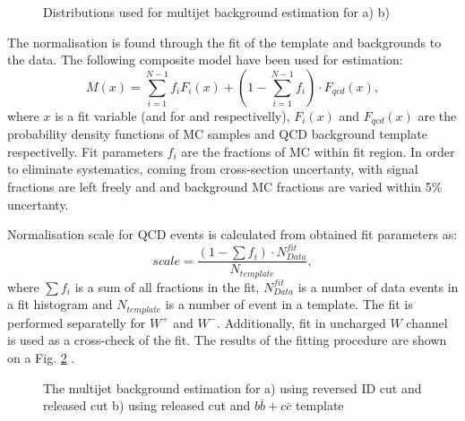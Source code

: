 \begin{figure}[!tbp]
\begin{minipage}[h]{0.49\linewidth}
\end{minipage}
\hfill
\begin{minipage}[h]{0.49\linewidth}
\end{minipage}
\caption{Distributions used for multijet background estimation for a) \wenu b)\wmunu}
\label{ris:FitDistributions}
\end{figure}

The normalisation is found through the \chiD fit of the template and backgrounds to the data. The following composite model have been used for estimation:
\begin{equation}
M(x) = \sum_{i=1}^{N-1}f_iF_i(x) + (1- \sum_{i=1}^{N-1} f_i)\cdot F_{qcd}(x),
\end{equation}
where $x$ is a fit variable (\etmiss and \mtw for \wenu and \wmunu respectivelly), $F_i(x)$ and $ F_{qcd}(x)$ are the probability density functions of MC samples and QCD background template respectivelly. Fit parameters $f_i$ are the fractions of MC within fit region. In order to eliminate systematics, coming from cross-section uncertanty, with signal fractions are left freely and and background MC fractions are varied within 5\% uncertanty. 

Normalisation scale for QCD events is calculated from obtained fit parameters as:
\begin{equation}
scale = \frac{(1-\sum f_i) \cdot N^{fit}_{Data}}{N_{template}},
\end{equation}
where $\sum f_i$ is a sum of all fractions in the fit, $N^{fit}_{Data}$ is a number of data events in a fit histogram and $N_{template}$ is a number of event in a template. The fit is performed separatelly for $W^{+}$ and $W^{-}$. Additionally, fit in uncharged $W$ channel is used as a cross-check of the fit. The results of the fitting procedure are shown on a Fig. \ref{ris:Fit} . 
 
\begin{figure}[!tbp]
\begin{minipage}[h]{0.49\linewidth}
\end{minipage}
\hfill
\begin{minipage}[h]{0.49\linewidth}
\end{minipage}
\caption{The multijet background estimation for a) \wenu using reversed ID cut and released \etmiss cut b) \wmunu using released \mtw cut and $b\bar{b}+c\bar{c}$ template}
\label{ris:Fit}
\end{figure}

